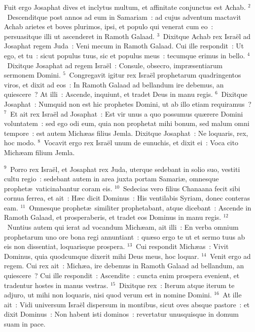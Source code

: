 \bchapter
\lettrine[lines=3,image=true,loversize=0.05,lraise=-0.03]{F}{}uit ergo Josaphat dives et inclytus multum, et affinitate conjunctus est Achab.
${}^{2}$~Descenditque post annos ad eum in Samariam~: ad cujus adventum mactavit Achab arietes et boves plurimos, ipsi, et populo qui venerat cum eo~: persuasitque illi ut ascenderet in Ramoth Galaad.
${}^{3}$~Dixitque Achab rex Isra\"el ad Josaphat regem Juda~: Veni mecum in Ramoth Galaad. Cui ille respondit~: Ut ego, et tu~: sicut populus tuus, sic et populus meus~: tecumque erimus in bello.
${}^{4}$~Dixitque Josaphat ad regem Isra\"el~: Consule, obsecro, impr\ae sentiarum sermonem Domini.
${}^{5}$~Congregavit igitur rex Isra\"el prophetarum quadringentos viros, et dixit ad eos~: In Ramoth Galaad ad bellandum ire debemus, an quiescere~? At illi~: Ascende, inquiunt, et tradet Deus in manu regis.
${}^{6}$~Dixitque Josaphat~: Numquid non est hic prophetes Domini, ut ab illo etiam requiramus~?
${}^{7}$~Et ait rex Isra\"el ad Josaphat~: Est vir unus a quo possumus qu\ae rere Domini voluntatem~: sed ego odi eum, quia non prophetat mihi bonum, sed malum omni tempore~: est autem Mich\ae as filius Jemla. Dixitque Josaphat~: Ne loquaris, rex, hoc modo.
${}^{8}$~Vocavit ergo rex Isra\"el unum de eunuchis, et dixit ei~: Voca cito Mich\ae am filium Jemla.


${}^{9}$~Porro rex Isra\"el, et Josaphat rex Juda, uterque sedebant in solio suo, vestiti cultu regio~: sedebant autem in area juxta portam Samari\ae , omnesque prophet\ae\ vaticinabantur coram eis.
${}^{10}$~Sedecias vero filius Chanaana fecit sibi cornua ferrea, et ait~: H\ae c dicit Dominus~: His ventilabis Syriam, donec conteras eam.
${}^{11}$~Omnesque prophet\ae\ similiter prophetabant, atque dicebant~: Ascende in Ramoth Galaad, et prosperaberis, et tradet eos Dominus in manu regis.
${}^{12}$~Nuntius autem qui ierat ad vocandum Mich\ae am, ait illi~: En verba omnium prophetarum uno ore bona regi annuntiant~: qu\ae so ergo te ut et sermo tuus ab eis non dissentiat, loquarisque prospera.
${}^{13}$~Cui respondit Mich\ae as~: Vivit Dominus, quia quodcumque dixerit mihi Deus meus, hoc loquar.
${}^{14}$~Venit ergo ad regem. Cui rex ait~: Mich\ae a, ire debemus in Ramoth Galaad ad bellandum, an quiescere~? Cui ille respondit~: Ascendite~: cuncta enim prospera evenient, et tradentur hostes in manus vestras.
${}^{15}$~Dixitque rex~: Iterum atque iterum te adjuro, ut mihi non loquaris, nisi quod verum est in nomine Domini.
${}^{16}$~At ille ait~: Vidi universum Isra\"el dispersum in montibus, sicut oves absque pastore~: et dixit Dominus~: Non habent isti dominos~: revertatur unusquisque in domum suam in pace.


